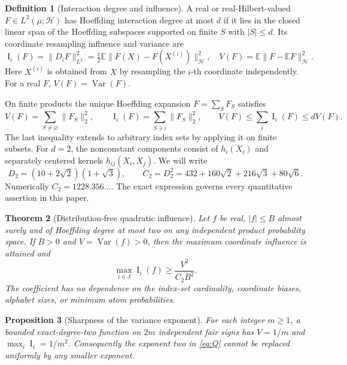 \documentclass[11pt,letterpaper]{article}
\newtheorem{theorem}{Theorem}[section]
\newtheorem{proposition}[theorem]{Proposition}
\theoremstyle{definition}
\newtheorem{definition}[theorem]{Definition}
\newcommand{\E}{\mathbb E}
\newcommand{\Var}{\operatorname{Var}}
\newcommand{\Inf}{\operatorname{I}}
\newcommand{\cH}{\mathcal H}
\newcommand{\norm}[1]{\lVert #1\rVert}
\begin{document}
\begin{definition}[Interaction degree and influence]
A real or real-Hilbert-valued $F\in L^2(\mu;\cH)$ has Hoeffding interaction
degree at most $d$ if it lies in the closed linear span of the Hoeffding
subspaces supported on finite $S$ with $|S|\le d$. Its coordinate resampling
influence and variance are
\begin{equation}\label{eq:infdef}
\Inf_i(F)=\norm{D_iF}_{L^2}^2
 =\tfrac12\E\norm{F(X)-F(X^{(i)})}_{\cH}^2,\quad
V(F)=\E\norm{F-\E F}_{\cH}^2.
\end{equation}
Here $X^{(i)}$ is obtained from $X$ by resampling the $i$-th coordinate
independently. For a real $F$, $V(F)=\Var(F)$.
\end{definition}
On finite products the unique Hoeffding expansion $F=\sum_S F_S$ satisfies
\begin{equation}\label{eq:anova}
V(F)=\sum_{S\ne\varnothing}\norm{F_S}_2^2,\qquad
\Inf_i(F)=\sum_{S\ni i}\norm{F_S}_2^2,\qquad
V(F)\le\sum_i\Inf_i(F)\le dV(F).
\end{equation}
The last inequality extends to arbitrary index sets by applying it on
finite subsets. For $d=2$, the nonconstant components consist of $h_i(X_i)$
and separately centered kernels $h_{ij}(X_i,X_j)$. We will write
\begin{equation}\label{eq:constants}
D_2=(10+2\sqrt2)(1+\sqrt3),\qquad C_2=D_2^2
=432+160\sqrt2+216\sqrt3+80\sqrt6.
\end{equation}
Numerically $C_2=1228.356\ldots$. The exact expression governs every
quantitative assertion in this paper.

\begin{theorem}[Distribution-free quadratic influence]\label{thm:q}
Let $f$ be real, $|f|\le B$ almost surely and of Hoeffding degree at most
two on any independent product probability space. If $B>0$ and
$V=\Var(f)>0$, then the maximum coordinate influence is attained and
\begin{equation}\label{eq:Q}
\boxed{\max_{i\in J}\Inf_i(f)\ge\frac{V^2}{C_2B^2}.}
\end{equation}
The coefficient has no dependence on the index-set cardinality, coordinate
biases, alphabet sizes, or minimum atom probabilities.
\end{theorem}
\begin{proposition}[Sharpness of the variance exponent]\label{prop:sharp}
For each integer $m\ge1$, a bounded exact-degree-two function on
$2m$ independent fair signs has $V=1/m$ and $\max_i\Inf_i=1/m^2$.
Consequently the exponent two in \eqref{eq:Q} cannot be replaced uniformly
by any smaller exponent.
\end{proposition}
\end{document}
